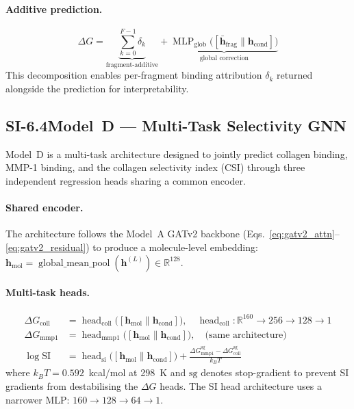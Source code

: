 \documentclass[11pt]{article}
\begin{document}
\paragraph{Additive prediction.}
\begin{equation}
  \Delta G = \underbrace{\sum_{k=0}^{F-1} \delta_k}_{
    \text{fragment-additive}}
  + \underbrace{\operatorname{MLP}_{\mathrm{glob}}\!\bigl(
    [\bar{\mathbf{h}}_{\mathrm{frag}} \| \mathbf{h}_{\mathrm{cond}}]
  \bigr)}_{\text{global correction}}
  \label{eq:frag_pred}
\end{equation}
This decomposition enables per-fragment binding attribution $\delta_k$
returned alongside the prediction for interpretability.

\subsection*{SI-6.4\quad Model~D --- Multi-Task Selectivity GNN}
\label{si:model_d}

Model~D is a multi-task architecture designed to jointly predict collagen
binding, MMP-1 binding, and the collagen selectivity index (CSI) through
three independent regression heads sharing a common encoder.

\paragraph{Shared encoder.}
The architecture follows the Model~A GATv2 backbone
(Eqs.~\ref{eq:gatv2_attn}--\ref{eq:gatv2_residual}) to produce a
molecule-level embedding:
$\mathbf{h}_{\mathrm{mol}} = \operatorname{global\_mean\_pool}(
\mathbf{h}^{(L)}) \in \mathbb{R}^{128}$.

\paragraph{Multi-task heads.}
\begin{align}
  \Delta G_{\mathrm{coll}} &= \operatorname{head}_{\mathrm{coll}}\!\bigl(
    [\mathbf{h}_{\mathrm{mol}} \| \mathbf{h}_{\mathrm{cond}}]\bigr),
    \quad \operatorname{head}_{\mathrm{coll}}:
    \mathbb{R}^{160} \to 256 \to 128 \to 1 \label{eq:head_coll} \\
  \Delta G_{\mathrm{mmp1}} &= \operatorname{head}_{\mathrm{mmp1}}\!\bigl(
    [\mathbf{h}_{\mathrm{mol}} \| \mathbf{h}_{\mathrm{cond}}]\bigr),
    \quad \text{(same architecture)} \label{eq:head_mmp1} \\
  \log \mathrm{SI} &= \operatorname{head}_{\mathrm{si}}\!\bigl(
    [\mathbf{h}_{\mathrm{mol}} \| \mathbf{h}_{\mathrm{cond}}]\bigr)
    + \frac{\Delta G_{\mathrm{mmp1}}^{\mathrm{sg}}
    - \Delta G_{\mathrm{coll}}^{\mathrm{sg}}}{k_B T}
    \label{eq:head_si}
\end{align}
where $k_B T = 0.592$~kcal/mol at 298~K and $\mathrm{sg}$ denotes
stop-gradient to prevent SI gradients from destabilising the
$\Delta G$ heads.
The SI head architecture uses a narrower MLP:
$160 \to 128 \to 64 \to 1$.
\end{document}
